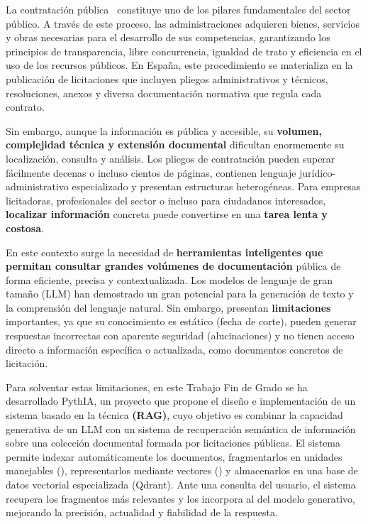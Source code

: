
La contratación pública~\cite{inroduccion:contr_publica} constituye uno de los pilares fundamentales del sector público. A través de este proceso, las administraciones adquieren bienes, servicios y obras necesarias para el desarrollo de sus competencias, garantizando los principios de transparencia, libre concurrencia, igualdad de trato y eficiencia en el uso de los recursos públicos. En España, este procedimiento se materializa en la publicación de licitaciones que incluyen pliegos administrativos y técnicos, resoluciones, anexos y diversa documentación normativa que regula cada contrato.

Sin embargo, aunque la información es pública y accesible, su \textbf{volumen, complejidad técnica y extensión documental} dificultan enormemente su localización, consulta y análisis. Los pliegos de contratación pueden superar fácilmente decenas o incluso cientos de páginas, contienen lenguaje jurídico-administrativo especializado y presentan estructuras heterogéneas. Para empresas licitadoras, profesionales del sector o incluso para ciudadanos interesados, \textbf{localizar información} concreta puede convertirse en una \textbf{tarea lenta y costosa}.

En este contexto surge la necesidad de \textbf{herramientas inteligentes que permitan consultar grandes volúmenes de documentación} pública de forma eficiente, precisa y contextualizada. Los modelos de lenguaje de gran tamaño (LLM) han demostrado un gran potencial para la generación de texto y la comprensión del lenguaje natural. Sin embargo, presentan \textbf{limitaciones} importantes, ya que su conocimiento es estático (fecha de corte), pueden generar respuestas incorrectas con aparente seguridad (alucinaciones) y no tienen acceso directo a información específica o actualizada, como documentos concretos de licitación.

Para solventar estas limitaciones, en este Trabajo Fin de Grado se ha desarrollado PythIA, un proyecto que propone el diseño e implementación de un sistema basado en la técnica \textbf{ (RAG)}, cuyo objetivo es combinar la capacidad generativa de un LLM con un sistema de recuperación semántica de información sobre una colección documental formada por licitaciones públicas. El sistema permite indexar automáticamente los documentos, fragmentarlos en unidades manejables (), representarlos mediante vectores () y almacenarlos en una base de datos vectorial especializada (Qdrant). Ante una consulta del usuario, el sistema recupera los fragmentos más relevantes y los incorpora al  del modelo generativo, mejorando la precisión, actualidad y fiabilidad de la respuesta.

